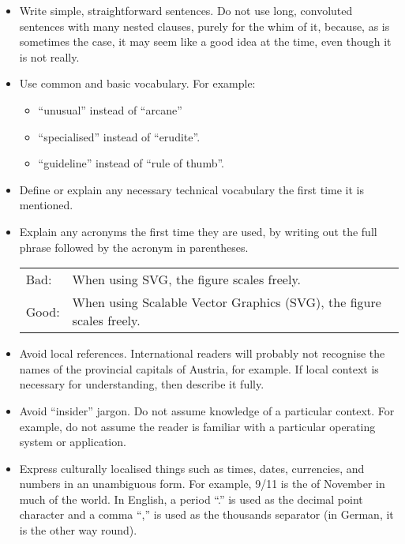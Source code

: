 \begin{itemize}
\item Write simple, straightforward sentences. Do not use long,
  convoluted sentences with many nested clauses, purely for the whim
  of it, because, as is sometimes the case, it may seem like a good
  idea at the time, even though it is not really.


\item Use common and basic vocabulary. For example:
  \begin{itemize}
  \item ``unusual'' instead of ``arcane''
  \item ``specialised'' instead of ``erudite''.
  \item ``guideline'' instead of ``rule of thumb''.
  \end{itemize}


\item Define or explain any necessary
  technical vocabulary the first time it is mentioned.


\item Explain any acronyms the first time they are used, by writing
  out the full phrase followed by the acronym in parentheses.

\begin{tabular}{lp{0.9\hsize}}
Bad:  & When using SVG, the figure scales freely. \\
Good: & When using Scalable Vector Graphics (SVG), the figure scales freely. \\
\end{tabular}


\item Avoid local references. International readers will probably not
  recognise the names of the provincial capitals of Austria, for
  example. If local context is necessary for understanding, then
  describe it fully.


\item Avoid ``insider'' jargon. Do not assume knowledge of a
  particular context. For example, do not assume the reader is
  familiar with a particular operating system or application.


\item Express culturally localised things such as times, dates,
  currencies, and numbers in an unambiguous form. For example, 9/11 is
  the  of November in much of the world. In English, a period
  ``.''  is used as the decimal point character and a comma ``,'' is
  used as the thousands separator (in German, it is the other way
  round).



\end{itemize}
